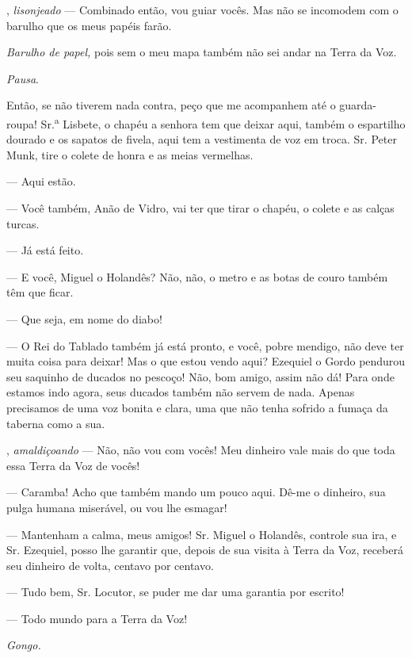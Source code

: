 \begin{myparindent}{0pt}
\begin{Parskip}
, \emph{lisonjeado} --- Combinado então, vou guiar vocês. Mas não
se incomodem com o barulho que os meus papéis farão.

\emph{Barulho de papel,} pois sem o meu mapa também não sei andar na
Terra da Voz.

\emph{Pausa}.

Então, se não tiverem nada contra, peço que me acompanhem até o
guarda-roupa! Sr.\textsuperscript{a} Lisbete, o chapéu a senhora tem que
deixar aqui, também o espartilho dourado e os sapatos de fivela, aqui
tem a vestimenta de voz em troca. Sr. Peter Munk, tire o colete de honra
e as meias vermelhas.

 --- Aqui estão.

 --- Você também, Anão de Vidro, vai ter que tirar o chapéu, o
colete e as calças turcas.

 --- Já está feito.

 --- E você, Miguel o Holandês? Não, não, o metro e as botas de
couro também têm que ficar.

 --- Que seja, em nome do diabo!

 --- O Rei do Tablado também já está pronto, e você, pobre
mendigo, não deve ter muita coisa para deixar! Mas o que estou vendo
aqui? Ezequiel o Gordo pendurou seu saquinho de ducados no pescoço! Não,
bom amigo, assim não dá! Para onde estamos indo agora, seus ducados
também não servem de nada. Apenas precisamos de uma voz bonita e clara,
uma que não tenha sofrido a fumaça da taberna como a sua.

, \emph{amaldiçoando} --- Não, não vou com vocês! Meu dinheiro
vale mais do que toda essa Terra da Voz de vocês!

 --- Caramba! Acho que também mando um pouco aqui. Dê-me
o dinheiro, sua pulga humana miserável, ou vou lhe esmagar!

 --- Mantenham a calma, meus amigos! Sr. Miguel o Holandês,
controle sua ira, e Sr. Ezequiel, posso lhe garantir que, depois de sua
visita à Terra da Voz, receberá seu dinheiro de volta, centavo por
centavo.

 --- Tudo bem, Sr. Locutor, se puder me dar uma garantia por
escrito!

 --- Todo mundo para a Terra da Voz!

\emph{Gongo.}


\end{Parskip}
\end{myparindent}
